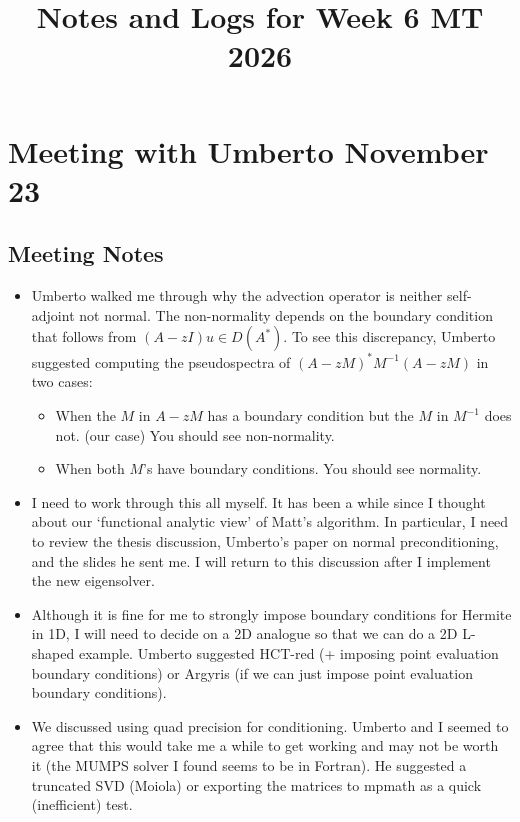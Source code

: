 \documentclass[12pt,a4paper]{article}
\title{\textbf{Notes and Logs for Week 6 MT 2026}}
\author{}
\date{}
\begin{document}
\maketitle

\section{Meeting with Umberto November 23}

\subsection{Meeting Notes}

\begin{itemize}
    \item Umberto walked me through why the advection operator is neither self-adjoint not normal. The non-normality depends on the boundary condition that follows from $(A-zI)u \in D(A^*).$ To see this discrepancy, Umberto suggested computing the pseudospectra of $(A-zM)^*M^{-1}(A-zM)$ in two cases: 
    \begin{itemize}
        \item When the $M$ in $A-zM$ has a boundary condition but the $M$ in $M^{-1}$ does not. (our case) You should see non-normality. 
        \item When both $M$'s have boundary conditions. You should see normality. 
    \end{itemize}
    \item I need to work through this all myself. It has been a while since I thought about our `functional analytic view' of Matt's algorithm. In particular, I need to review the thesis discussion, Umberto's paper on normal preconditioning, and the slides he sent me. I will return to this discussion after I implement the new eigensolver. 
    \item Although it is fine for me to strongly impose boundary conditions for Hermite in 1D, I will need to decide on a 2D analogue so that we can do a 2D L-shaped example. Umberto suggested HCT-red (+ imposing point evaluation boundary conditions) or Argyris (if we can just impose point evaluation boundary conditions). 
    \item We discussed using quad precision for conditioning. Umberto and I seemed to agree that this would take me a while to get working and may not be worth it (the MUMPS solver I found seems to be in Fortran). He suggested a truncated SVD (Moiola) or exporting the matrices to mpmath as a quick (inefficient) test. 

\end{itemize}
\end{document}

